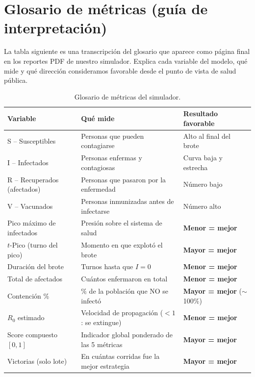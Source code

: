 \documentclass[spanish,notitlepage,letterpaper, 12pt]{article}
\begin{document}
\section{Glosario de m\'etricas (gu\'ia de interpretaci\'on)}
\label{anexo:glosario}

La tabla siguiente es una transcripci\'on del glosario que aparece como p\'agina final en los reportes PDF de nuestro simulador. Explica cada variable del modelo, qu\'e mide y qu\'e direcci\'on consideramos favorable desde el punto de vista de salud p\'ublica.

\begin{table}[H]
\centering
\small
\caption{Glosario de m\'etricas del simulador.}
\label{tab:glosario}
\begin{tabular}{l p{6cm} p{4cm}}
\toprule
\textbf{Variable} & \textbf{Qu\'e mide} & \textbf{Resultado favorable} \\
\midrule
S -- Susceptibles & Personas que pueden contagiarse & Alto al final del brote \\
I -- Infectados & Personas enfermas y contagiosas & Curva baja y estrecha \\
R -- Recuperados (afectados) & Personas que pasaron por la enfermedad & N\'umero bajo \\
V -- Vacunados & Personas inmunizadas antes de infectarse & N\'umero alto \\
Pico m\'aximo de infectados & Presi\'on sobre el sistema de salud & \textbf{Menor = mejor} \\
$t$-Pico (turno del pico) & Momento en que explot\'o el brote & \textbf{Mayor = mejor} \\
Duraci\'on del brote & Turnos hasta que $I = 0$ & \textbf{Menor = mejor} \\
Total de afectados & Cu\'antos enfermaron en total & \textbf{Menor = mejor} \\
Contenci\'on \% & \% de la poblaci\'on que NO se infect\'o & \textbf{Mayor = mejor} ($\sim$ 100\%) \\
$R_0$ estimado & Velocidad de propagaci\'on ($< 1$: se extingue) & \textbf{Menor = mejor} \\
Score compuesto $[0, 1]$ & Indicador global ponderado de las 5 m\'etricas & \textbf{Mayor = mejor} \\
Victorias (solo lote) & En cu\'antas corridas fue la mejor estrategia & \textbf{Mayor = mejor} \\
\bottomrule
\end{tabular}
\end{table}
\end{document}
